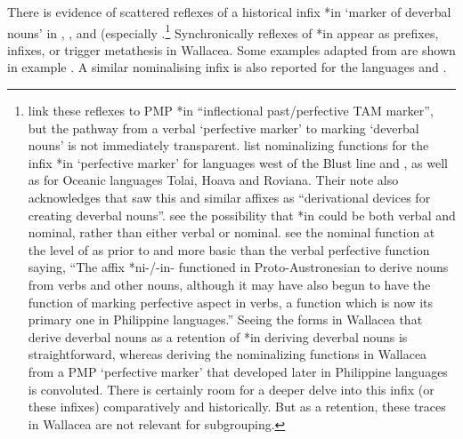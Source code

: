 There is evidence of scattered reflexes of a historical infix
*\<in\> ‘marker of deverbal nouns’ in ,
, and  (especially .\footnote{
		\citet[575]{SchapperZobel2024a} link these reflexes to PMP *\<in\> “inflectional
		past/perfective TAM marker”, but the pathway from a verbal ‘perfective marker’ to marking
		‘deverbal nouns’ is not immediately transparent.
		\citet{BlustTrussel2020} list nominalizing functions for the
		 infix *\<in\> ‘perfective marker’ for languages west of the Blust line
		 and , as well as for Oceanic languages Tolai, Hoava and Roviana.
		Their note also acknowledges that \citet{StarostaPawleyReid1982} saw this
		and similar affixes as “derivational devices for creating deverbal nouns”.
		\citet{BlustTrussel2020} see the possibility that  *\<in\> could be both
		verbal and nominal, rather than either verbal or nominal.
		\citet[163]{StarostaPawleyReid1982} see the nominal function
		at the level of  as prior to
		and more basic than the verbal perfective function saying,
		“The affix *ni-/-in- functioned in Proto-Austronesian to derive
		nouns from verbs and other nouns, although it may have also begun to have the
		function of marking perfective aspect in verbs,
		a function which is now its primary one in Philippine languages.”
		Seeing the forms in Wallacea that derive deverbal nouns as a
		retention of  *\<in\> deriving deverbal nouns is straightforward,
		whereas deriving the nominalizing functions in Wallacea from
		a PMP ‘perfective marker’ that developed later in Philippine languages is convoluted.
		There is certainly room for a deeper delve into this infix (or
		these infixes) comparatively and historically.
		But as a retention,
		these traces in Wallacea are not relevant for subgrouping.}
Synchronically reflexes of *\<in\> appear as prefixes,
infixes, or trigger metathesis in Wallacea.
Some examples adapted from \citet[575f]{SchapperZobel2024a} are
shown in example .
A similar nominalising infix is also reported for the 
languages  and .
\\

